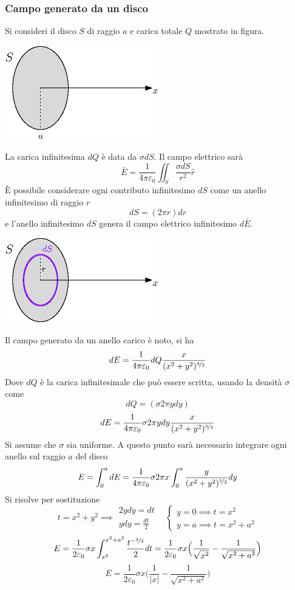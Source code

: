 \documentclass[10pt, letterpaper]{report}
\begin{document}
\subsubsection{Campo generato da un disco}
Si consideri il disco $S$ di raggio $a$ e carica  totale $Q$ mostrato in figura.\begin{center}
    \includegraphics[width=0.5\textwidth]{images/discoCarico.eps}
\end{center}
La carica infinitesima $dQ$ è data da $\sigma dS$. Il campo elettrico sarà 
$$ \bar E = \frac{1}{4\pi\varepsilon_0}\iint_S \frac{\sigma dS}{r^2}\hat r $$
È possibile considerare ogni contributo infinitesimo $dS$ come un anello infinitesimo di raggio 
$r$
$$ dS=(2\pi r)dr$$
e l'anello infinitesimo $dS$ genera il campo elettrico infinitesimo $d\bar E$.
\begin{center}
    \includegraphics[width=0.5\textwidth]{images/discoCarico2.eps}
\end{center}
Il campo generato da un anello carico è noto, si ha 
$$ dE=\frac{1}{4\pi\varepsilon_0}dQ\frac{x}{(x^2+y^2)^{\nicefrac{3}{2}}}$$
Dove $dQ$ è la carica infinitesimale che può essere scritta, usando la densità $\sigma$ come 
$$ dQ=(\sigma 2\pi ydy)$$
$$ dE=\frac{1}{4\pi\varepsilon_0}\sigma 2\pi ydy \frac{x}{(x^2+y^2)^{\nicefrac{3}{2}}}$$
Si assume che $\sigma$ sia uniforme. A questo punto sarà necessario integrare ogni anello sul raggio 
$a$ del disco 
$$E=\int_0^a dE = \frac{1}{4\pi\varepsilon_0}\sigma 2\pi x \int_0^a \frac{y}{(x^2+y^2)^{\nicefrac{3}{2}}}dy $$
Si risolve per sostituzione 
$$ t=x^2+y^2 \implies \begin{matrix}
    2ydy=dt \\ ydy=\frac{dt}{2}
\end{matrix} \ \ \ \ \begin{cases}
    y=0\implies t=x^2 \\ 
    y=a\implies t = x^2+a^2
\end{cases}$$
$$E= \frac{1}{2\varepsilon_0}\sigma x \int_{x^2}^{x^2+a^2}\frac{t^{-\nicefrac{3}{2}}}{2}dt = 
\frac{1}{2\varepsilon_0}\sigma x\Big( \frac{1}{\sqrt{x^2}}-\frac{1}{\sqrt{x^2+a^2}} \Big)
$$
$$ E=\frac{1}{2\varepsilon_0}\sigma x\Big( \frac{1}{|x|}-\frac{1}{\sqrt{x^2+a^2}} \Big)$$
\end{document}
